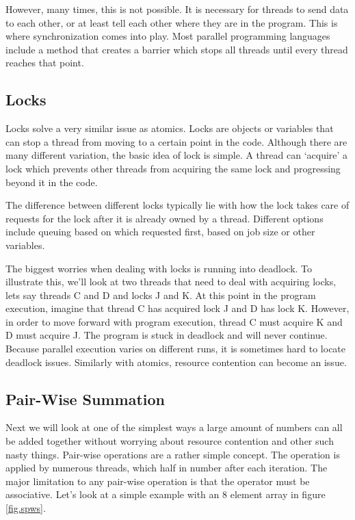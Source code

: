 \documentclass{article}
\begin{document}
    However, many times, this is not possible. It is necessary for threads to send data to each other, or at least tell each other where they are in the program. This is where synchronization comes into play. Most parallel programming languages include a method that creates a barrier which stops all threads until every thread reaches that point.

	
    
    \subsection{Locks}
    Locks solve a very similar issue as atomics. Locks are objects or variables that can stop a thread from moving to a certain point in the code. Although there are many different variation, the basic idea of lock is simple. A thread can `acquire' a lock which prevents other threads from acquiring the same lock and progressing beyond it in the code.

    The difference between different locks typically lie with how the lock takes care of requests for the lock after it is already owned by a thread. Different options include queuing based on which requested first, based on job size or other variables.

    The biggest worries when dealing with locks is running into deadlock. To illustrate this, we'll look at two threads that need to deal with acquiring locks, lets say threads C and D and locks J and K. At this point in the program execution, imagine that thread C has acquired lock J and D has lock K. However, in order to move forward with program execution, thread C must acquire K and D must acquire J. The program is stuck in deadlock and will never continue. Because parallel execution varies on different runs, it is sometimes hard to locate deadlock issues. Similarly with atomics, resource contention can become an issue.
	
	\subsection{Pair-Wise Summation}
    \label{sec.pairwise}
    Next we will look at one of the simplest ways a large amount of numbers can all be added together without worrying about resource contention and other such nasty things. Pair-wise operations are a rather simple concept. The operation is applied by numerous threads, which half in number after each iteration. The major limitation to any pair-wise operation is that the operator must be associative. Let's look at a simple example with an 8 element array in figure \ref{fig.spws}.
\end{document}
